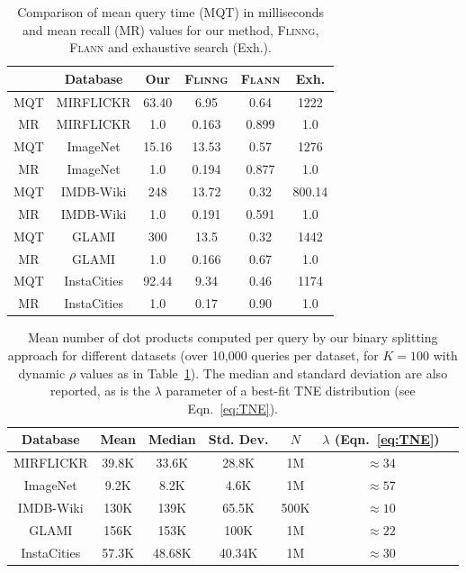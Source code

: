 \documentclass[sigconf, anonymous, review]{acmart}
\begin{document}
\begin{table}
\centering
\begin{tabular}{ |c|c|c|c|c|c| } 
 \hline
 \rowcolor{Gray}
 & Database & Our & \textsc{Flinng}\cite{Engels2021} & \textsc{Flann}\cite{Muja2014} & Exh.\\\hline 
 MQT &  \textsf{MIRFLICKR} & 63.40 & 6.95 & 0.64 & 1222\\
MR & \textsf{MIRFLICKR} & 1.0 & 0.163 & 0.899 & 1.0 \\\hline
MQT &  \textsf{ImageNet} & 15.16 & 13.53 & 0.57 & 1276\\
MR & \textsf{ImageNet} & 1.0 & 0.194 & 0.877 & 1.0 \\\hline
MQT &  \textsf{IMDB-Wiki} & 248 & 13.72 & 0.32 & 800.14\\
MR & \textsf{IMDB-Wiki} & 1.0 & 0.191 & 0.591 & 1.0 \\\hline
MQT &  \textsf{GLAMI} & 300 & 13.5 & 0.32 & 1442\\
MR & \textsf{GLAMI} & 1.0 & 0.166 & 0.67 & 1.0\\\hline
MQT & \textsf{InstaCities}  & 92.44 & 9.34 & 0.46 & 1174\\
MR & \textsf{InstaCities} & 1.0 & 0.17 & 0.90 & 1.0\\
 \hline
\end{tabular}
\caption{Comparison of mean query time (MQT) in milliseconds and mean recall (MR) values for our method, \textsc{Flinng}\cite{Engels2021}, \textsc{Flann}\cite{Muja2014} and exhaustive search (Exh.).}
\label{tab:query_recall_comparison}
\end{table}

\begin{table}
\centering
\begin{tabular}{ |c|c|c|c|c|c|c| } 
 \hline
 \rowcolor{Gray}
Database & Mean & Median & Std. Dev. & $N$ & $\lambda$ (Eqn.~\ref{eq:TNE}) \\\hline 
\textsf{MIRFLICKR} & 39.8K & 33.6K & 28.8K & 1M & $\approx 34$\\
\textsf{ImageNet} & 9.2K & 8.2K & 4.6K & 1M & $\approx 57$\\
\textsf{IMDB-Wiki} & 130K & 139K & 65.5K & 500K & $\approx 10$\\
\textsf{GLAMI} &  156K & 153K & 100K & 1M & $ \approx 22$\\
\textsf{InstaCities} &  57.3K & 48.68K & 40.34K & 1M & $ \approx 30$\\
 \hline
\end{tabular}
\caption{Mean number of dot products computed per query by our binary splitting approach for different datasets (over 10,000 queries per dataset, for $K = 100$ with dynamic $\rho$ values as in Table~\ref{tab:query_recall_comparison}). The median and standard deviation are also reported, as is the $\lambda$ parameter of a best-fit TNE distribution (see Eqn.~\ref{eq:TNE}).}
\label{tab:dotproducts_stats}
\end{table}
\end{document}
